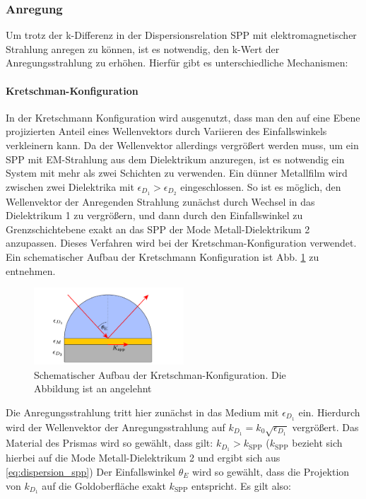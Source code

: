 \documentclass[titlepage]{article}
\begin{document}
		\subsubsection{Anregung}
			Um trotz der k-Differenz in der Dispersionsrelation SPP mit elektromagnetischer Strahlung anregen zu können, ist es notwendig, den k-Wert der Anregungsstrahlung zu erhöhen. Hierfür gibt es unterschiedliche Mechanismen:
			\paragraph{Kretschman-Konfiguration}
			In der Kretschmann Konfiguration wird ausgenutzt, dass man den auf eine Ebene projizierten Anteil eines Wellenvektors durch Variieren des Einfallswinkels verkleinern kann. Da der Wellenvektor allerdings vergrößert werden muss, um ein SPP mit EM-Strahlung aus dem Dielektrikum anzuregen, ist es notwendig ein System mit mehr als zwei Schichten zu verwenden. Ein dünner Metallfilm wird zwischen zwei Dielektrika mit $\epsilon_{D_1} > \epsilon_{D_2}$ eingeschlossen. So ist es möglich, den Wellenvektor der Anregenden Strahlung zunächst durch Wechsel in das Dielektrikum 1 zu vergrößern, und dann durch den Einfallswinkel zu Grenzschichtebene exakt an das SPP der Mode Metall-Dielektrikum 2 anzupassen. Dieses Verfahren wird bei der Kretschman-Konfiguration verwendet. Ein schematischer Aufbau der Kretschmann Konfiguration ist Abb. \ref{fig:kretschman} zu entnehmen.
				\begin{figure}[h] 
				\centering
				\includegraphics[width=0.5\textwidth]{figures/Kretschmann.pdf}
				\caption{Schematischer Aufbau der Kretschman-Konfiguration. Die Abbildung ist an \cite{Jaruschewski.2020} angelehnt}
				\label{fig:kretschman}
				\end{figure}
			Die Anregungsstrahlung tritt hier zunächst in das Medium mit $\epsilon_{D_1}$ ein. Hierdurch wird der Wellenvektor der Anregungsstrahlung auf $k_{D_1}=k_0\sqrt{\epsilon_{D_1}}$ vergrößert. Das Material des Prismas wird so gewählt, dass gilt:  $k_{D_1}> k_{\mathrm{SPP}}$ ($k_{\mathrm{SPP}}$ bezieht sich hierbei auf die Mode Metall-Dielektrikum 2 und ergibt sich aus \eqref{eq:dispersion_spp}) Der Einfallswinkel $\theta_E$ wird so gewählt, dass die Projektion von $k_{D_1}$ auf die Goldoberfläche exakt $k_{\mathrm{SPP}}$ entspricht. Es gilt also:
\end{document}
